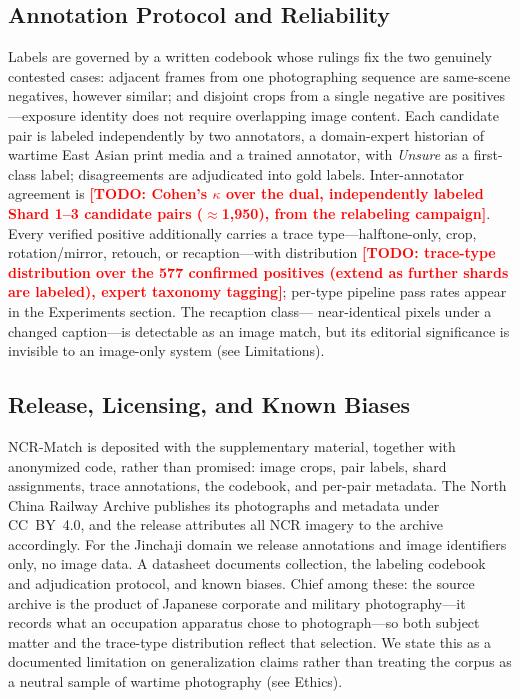 \documentclass[letterpaper]{article} %
\newcommand{\todo}[1]{\textcolor{red}{\textbf{[TODO: #1]}}}
\begin{document}
\subsection{Annotation Protocol and Reliability}

Labels are governed by a written codebook whose rulings fix the two genuinely
contested cases: adjacent frames from one photographing sequence are
same-scene negatives, however similar; and disjoint crops from a single
negative are positives---exposure identity does not require overlapping image
content. Each candidate pair is labeled independently by two annotators, a
domain-expert historian of wartime East Asian print media and a trained
annotator, with \emph{Unsure} as a first-class label; disagreements are
adjudicated into gold labels. Inter-annotator agreement is \todo{Cohen's
$\kappa$ over the dual, independently labeled Shard 1--3 candidate pairs
($\approx$1{,}950), from the relabeling campaign}. Every verified positive
additionally carries a trace type---halftone-only, crop, rotation/mirror,
retouch, or recaption---with distribution \todo{trace-type distribution over
the 577 confirmed positives (extend as further shards are labeled), expert
taxonomy tagging}; per-type pipeline
pass rates appear in the Experiments section. The recaption class---
near-identical pixels under a changed caption---is detectable as an image
match, but its editorial significance is invisible to an image-only system
(see Limitations).

\subsection{Release, Licensing, and Known Biases}

NCR-Match is deposited with the supplementary material, together with
anonymized code, rather than promised: image crops, pair labels, shard
assignments, trace annotations, the codebook, and per-pair metadata. The
North China Railway Archive publishes its photographs and metadata under
CC~BY~4.0, and the release attributes all NCR imagery to the archive
accordingly. For the Jinchaji domain we release annotations and image
identifiers only, no image data. A datasheet \cite{gebru2021datasheets}
documents collection, the labeling codebook and adjudication protocol, and
known biases. Chief among these: the source archive is the product of
Japanese corporate and military photography---it records what an occupation
apparatus chose to photograph---so both subject matter and the trace-type
distribution reflect that selection. We state this as a documented limitation
on generalization claims rather than treating the corpus as a neutral sample
of wartime photography (see Ethics).
\end{document}
